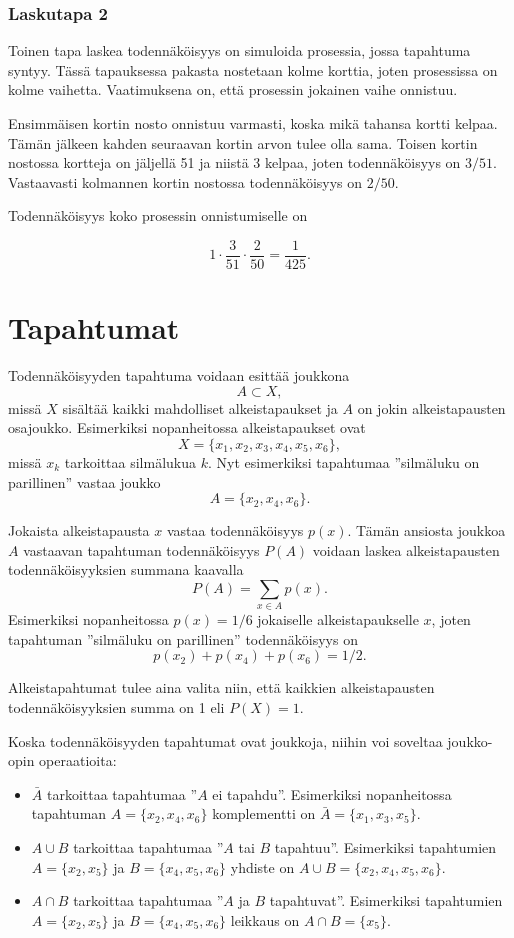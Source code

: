 \subsubsection*{Laskutapa 2}

Toinen tapa laskea todennäköisyys on simuloida prosessia,
jossa tapahtuma syntyy.
Tässä tapauksessa pakasta nostetaan kolme korttia,
joten prosessissa on kolme vaihetta.
Vaatimuksena on, että prosessin jokainen vaihe onnistuu.

Ensimmäisen kortin nosto onnistuu varmasti,
koska mikä tahansa kortti kelpaa.
Tämän jälkeen kahden seuraavan kortin
arvon tulee olla sama.
Toisen kortin nostossa kortteja on jäljellä 51
ja niistä 3 kelpaa, joten todennäköisyys on $3/51$.
Vastaavasti kolmannen kortin nostossa
todennäköisyys on $2/50$.

Todennäköisyys koko prosessin onnistumiselle on

\[1 \cdot \frac{3}{51} \cdot \frac{2}{50} = \frac{1}{425}.\]

\section{Tapahtumat}

Todennäköisyyden tapahtuma
voidaan esittää joukkona
\[A \subset X,\]
missä $X$ sisältää kaikki mahdolliset alkeistapaukset
ja $A$ on jokin alkeistapausten osajoukko.
Esimerkiksi nopanheitossa alkeistapaukset ovat
\[X = \{x_1,x_2,x_3,x_4,x_5,x_6\},\]
missä $x_k$ tarkoittaa silmälukua $k$.
Nyt esimerkiksi tapahtumaa ''silmäluku on parillinen''
vastaa joukko
\[A = \{x_2,x_4,x_6\}.\]

Jokaista alkeistapausta $x$
vastaa todennäköisyys $p(x)$.
Tämän ansiosta joukkoa $A$ vastaavan tapahtuman
todennäköisyys $P(A)$ voidaan
laskea alkeistapausten todennäköisyyksien
summana kaavalla
\[P(A) = \sum_{x \in A} p(x).\]
Esimerkiksi nopanheitossa $p(x)=1/6$
jokaiselle alkeistapaukselle $x$, joten
tapahtuman ''silmäluku on parillinen''
todennäköisyys on
\[p(x_2)+p(x_4)+p(x_6)=1/2.\]

Alkeistapahtumat tulee aina valita niin,
että kaikkien alkeistapausten
todennäköisyyksien summa on 1 eli $P(X)=1$.

Koska todennäköisyyden tapahtumat ovat joukkoja,
niihin voi soveltaa jouk\-ko-opin operaatioita:

\begin{itemize}
\item {} $\bar A$ tarkoittaa
tapahtumaa ''$A$ ei tapahdu''. 
Esimerkiksi nopanheitossa tapahtuman
$A=\{x_2,x_4,x_6\}$ komplementti on
$\bar A = \{x_1,x_3,x_5\}$.
\item {} $A \cup B$ tarkoittaa
tapahtumaa ''$A$ tai $B$ tapahtuu''.
Esimerkiksi tapahtumien $A=\{x_2,x_5\}$
ja $B=\{x_4,x_5,x_6\}$ yhdiste on
$A \cup B = \{x_2,x_4,x_5,x_6\}$.
\item {} $A \cap B$ tarkoittaa
tapahtumaa ''$A$ ja $B$ tapahtuvat''.
Esimerkiksi tapahtumien $A=\{x_2,x_5\}$
ja $B=\{x_4,x_5,x_6\}$ leikkaus on
$A \cap B = \{x_5\}$.
\end{itemize}


